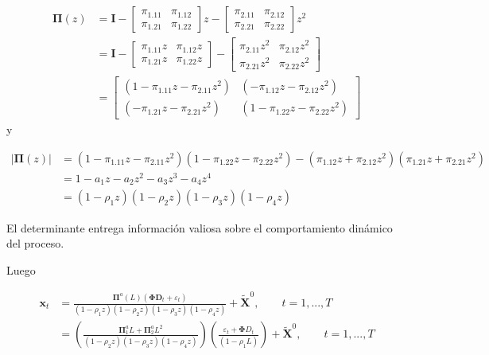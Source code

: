 \documentclass[12pt, twoside]{book}\usepackage[]{graphicx}\usepackage[]{color}
\let\bold\boldsymbol
\numberwithin{equation}{section}
\numberwithin{theorem}{section}
\numberwithin{teorema}{section}
\numberwithin{defi}{section}
\numberwithin{prop}{section}
\numberwithin{defi}{section}
\theoremstyle{plain}
\begin{document}
{{\begin{align}
\bold{\Pi}(z) & = \bold{I}-\left[\begin{array}{cc} 
\pi_{1.11} & \pi_{1.12} \\
\pi_{1.21} & \pi_{1.22}
\end{array}\right]z- \left[\begin{array}{cc} 
\pi_{2.11} & \pi_{2.12} \\
\pi_{2.21} & \pi_{2.22}
\end{array}\right]z^{2} \\
              & = \bold{I}-\left[\begin{array}{cc} 
\pi_{1.11}z & \pi_{1.12}z \\
\pi_{1.21}z & \pi_{1.22}z
\end{array}\right]- \left[\begin{array}{cc} 
\pi_{2.11}z^{2} & \pi_{2.12}z^{2} \\
\pi_{2.21}z^{2} & \pi_{2.22}z^{2}
\end{array}\right] \\
 & = \left[\begin{array}{cc} (1-\pi_{1.11}z-\pi_{2.11}z^{2}) & (-\pi_{1.12}z-\pi_{2.12}z^{2}) \\ 
 (-\pi_{1.21}z-\pi_{2.21}z^{2}) & (1-\pi_{1.22}z-\pi_{2.22}z^{2})
 \end{array}\right]
\end{align}
y 

\begin{align}
|\boldsymbol{\Pi}(z)| & = (1-\pi_{1.11}z-\pi_{2.11}z^{2})(1-\pi_{1.22}z-\pi_{2.22}z^{2})-(\pi_{1.12}z+\pi_{2.12}z^{2})(\pi_{1.21}z+\pi_{2.21}z^{2}) \\ 
& = 1-a_{1}z-a_{2}z^{2}-a_{3}z^{3}-a_{4}z^{4} \\ 
& = (1-\rho_{1}z)(1-\rho_{2}z)(1-\rho_{3}z)(1-\rho_{4}z)
\end{align}

El determinante entrega información valiosa sobre el comportamiento dinámico del proceso. 

Luego 

\begin{align}
\bold{x}_{t} & = \frac{\boldsymbol{\Pi}^{a}(L)(\boldsymbol{\Phi}\bold{D}_{t}+\varepsilon_{t})}{(1-\rho_{1}z)(1-\rho_{2}z)(1-\rho_{3}z)(1-\rho_{4}z)}+\tilde{\bold{X}}^{0}, \qquad t=1,...,T \\ 
& = \left(\frac{\bold{\Pi}_{1}^{a}L+\bold{\Pi}^{a}_{2}L^{2}}{(1-\rho_{2}z)(1-\rho_{3}z)(1-\rho_{4}z)}\right)\left(\frac{\varepsilon_{t}+\bold{\Phi}D_{t}}{(1-\rho_{1}L)}\right)+\bold{\tilde{X}}^{0}, \qquad t=1,...,T
\end{align}

}}
\end{document}

